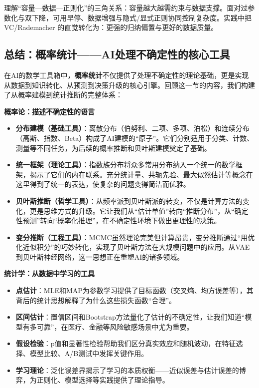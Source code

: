 理解``容量—数据—正则化''的三角关系：容量越大越需约束与数据支撑。面对过参数化与双下降，可用早停、数据增强与隐式/显式正则协同控制复杂度。实践中把 VC/Rademacher 的直觉转化为：更强的归纳偏置与更好的数据质量。

\subsection{总结：概率统计——AI处理不确定性的核心工具}

在AI的数学工具箱中，\textbf{概率统计}不仅提供了处理不确定性的理论基础，更是实现从数据到知识转化、从预测到决策升级的核心引擎。回顾这一节的内容，我们构建了从概率建模到统计推断的完整体系：

\textbf{概率论：描述不确定性的语言}
\begin{itemize}
    \item \textbf{分布建模（基础工具）}：离散分布（伯努利、二项、多项、泊松）和连续分布（高斯、指数、Beta）构成了AI建模的``原子''。它们分别适用于分类、计数、测量等不同任务，为后续的概率推断和贝叶斯建模奠定了基础。

    \item \textbf{统一框架（理论工具）}：指数族分布将众多常用分布纳入一个统一的数学框架，揭示了它们的内在联系。充分统计量、共轭先验、最大似然估计等概念在这里得到了统一的表达，使复杂的问题变得简洁而优雅。

    \item \textbf{贝叶斯推断（哲学工具）}：从频率派到贝叶斯派的转变，不仅是计算方法的变化，更是思维方式的升级。它让我们从``估计单值''转向``推断分布''，从``确定性预测''转向``概率化推理''，在不确定性环境下做出更理性的决策。

    \item \textbf{变分推断（工程工具）}：MCMC虽然理论完美但计算昂贵，变分推断通过``用优化近似积分''的巧妙转化，实现了贝叶斯方法在大规模问题中的应用。从VAE到贝叶斯神经网络，这一思想正在重塑AI的诸多领域。
\end{itemize}

\textbf{统计学：从数据中学习的工具}
\begin{itemize}
    \item \textbf{点估计}：MLE和MAP为参数学习提供了目标函数（交叉熵、均方误差等），其背后的统计思想解释了为什么这些损失函数``合理''。

    \item \textbf{区间估计}：置信区间和Bootstrap方法量化了估计的不确定性，让我们知道``模型有多可靠''，在医疗、金融等风险敏感场景中尤为重要。

    \item \textbf{假设检验}：p值和显著性检验帮助我们区分真实效应和随机波动，在特征选择、模型比较、A/B测试中发挥关键作用。

    \item \textbf{学习理论}：泛化误差界揭示了学习的本质权衡——近似误差与估计误差的博弈，为正则化、模型选择等实践提供了理论指导。
\end{itemize}

